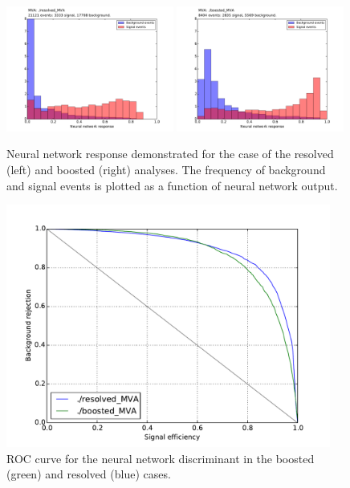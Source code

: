 \documentclass[12pt]{article}
\begin{document}
\begin{figure}[h]
\begin{center}
\includegraphics[width=0.49\textwidth]{plots/resolved_MVA_hist.pdf}
\includegraphics[width=0.49\textwidth]{plots/boosted_MVA_hist.pdf}
\caption{Neural network response demonstrated for the case of the resolved (left) and boosted (right) analyses. The frequency of background and signal events is plotted as a function of neural network output.}
\label{fig:nnresponse}
\end{center}
\end{figure}

\begin{figure}[h]
\begin{center}
\includegraphics[width=0.95\textwidth]{plots/example_roc.pdf}
\caption{ROC curve for the neural network discriminant in the boosted (green) and resolved (blue) cases.}
\label{fig:exampleroc}
\end{center}
\end{figure}
\end{document}
